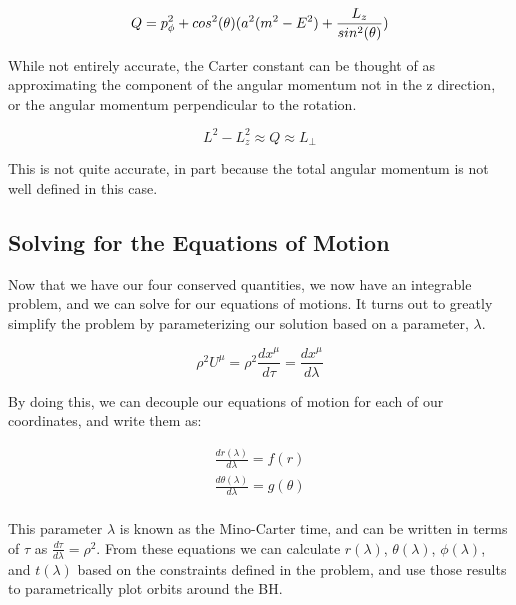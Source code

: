 \documentclass[11pt,table]{article}
\begin{document}
\begin{equation}
    Q = p_\phi^2 + cos^2(\theta)(a^2(m^2-E^2) + \frac{L_z}{sin^2(\theta)})\\
    \label{eq:carter}
\end{equation}

While not entirely accurate, the Carter constant can be thought of as approximating the component of the angular momentum not in the z direction, or the angular momentum perpendicular to the rotation.

\begin{equation}
    L^2 - L_z^2 \approx Q \approx L_\perp 
    \label{eq:lperp}
\end{equation}

This is not quite accurate, in part because the total angular momentum is not well defined in this case.

\subsection{Solving for the Equations of Motion}

Now that we have our four conserved quantities, we now have an integrable problem, and we can solve for our equations of motions. It turns out to greatly simplify the problem by parameterizing our solution based on a parameter, $\lambda$.

\begin{equation}
    \rho^2 U^\mu = \rho^2 \frac{dx^\mu}{d\tau} = \frac{dx^\mu}{d\lambda}
    \label{eq:paramEq}
\end{equation}

By doing this, we can decouple our equations of motion for each of our coordinates, and write them as:

\begin{equation}
    \begin{aligned}
         \frac{dr(\lambda)}{d\lambda} = f(r) \\
         \frac{d\theta(\lambda)}{d\lambda} = g(\theta) \\
        \label{eq:EQM}
    \end{aligned}
\end{equation}

This parameter $\lambda$ is known as the Mino-Carter time, and can be written in terms of $\tau$ as $\frac{d\tau}{d\lambda} = \rho^2$. From these equations we can calculate $r(\lambda)$, $\theta(\lambda)$, $\phi(\lambda)$, and $t(\lambda)$ based on the constraints defined in the problem, and use those results to parametrically plot orbits around the BH. \\
\end{document}
